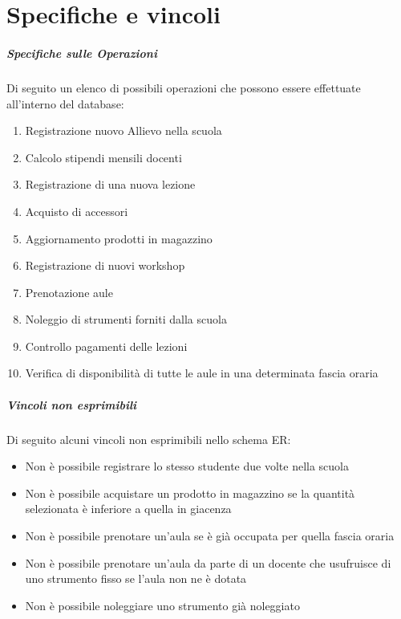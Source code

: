 \chapter{Specifiche e vincoli}
\paragraph{Specifiche sulle Operazioni} Di seguito un elenco di possibili operazioni che possono essere effettuate all'interno del database: 
\begin{enumerate}
    \item Registrazione nuovo Allievo nella scuola
    \item Calcolo stipendi mensili docenti 
    \item Registrazione di una nuova lezione
    \item Acquisto di accessori 
    \item Aggiornamento prodotti in magazzino 
    \item Registrazione di nuovi workshop 
    \item Prenotazione aule
    \item Noleggio di strumenti forniti dalla scuola
    \item Controllo pagamenti delle lezioni
    \item Verifica di disponibilità di tutte le aule in una determinata fascia oraria
\end{enumerate}
\paragraph{Vincoli non esprimibili} Di seguito alcuni vincoli non esprimibili nello schema ER: 
\begin{itemize}
    \item Non è possibile registrare lo stesso studente due volte nella scuola
    \item Non è possibile acquistare un prodotto in magazzino se la quantità selezionata è inferiore a quella in giacenza
    \item Non è possibile prenotare un'aula se è già occupata per quella fascia oraria 
    \item Non è possibile prenotare un'aula da parte di un docente che usufruisce di uno strumento fisso se l'aula non ne è dotata
    \item Non è possibile noleggiare uno strumento già noleggiato
\end{itemize}
